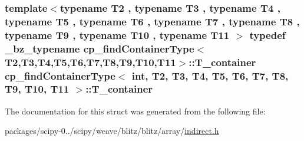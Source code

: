 \subsubsection[{T\+\_\+container}]{\setlength{\rightskip}{0pt plus 5cm}template$<$typename T2 , typename T3 , typename T4 , typename T5 , typename T6 , typename T7 , typename T8 , typename T9 , typename T10 , typename T11 $>$ typedef {\bf \+\_\+bz\+\_\+typename} {\bf cp\+\_\+find\+Container\+Type}$<$T2,T3,T4,T5,T6,T7,T8,T9,T10,T11$>$\+::{\bf T\+\_\+container} {\bf cp\+\_\+find\+Container\+Type}$<$ int, T2, T3, T4, T5, T6, T7, T8, T9, T10, T11 $>$\+::{\bf T\+\_\+container}}\label{structcp__findContainerType_3_01int_00_01T2_00_01T3_00_01T4_00_01T5_00_01T6_00_01T7_00_01T8_00_01T9_00_01T10_00_01T11_01_4_a237316b3c2e3063068f6dc36d31b8b5b}


The documentation for this struct was generated from the following file\+:\begin{DoxyCompactItemize}
\item 
packages/scipy-\/0../scipy/weave/blitz/blitz/array/\hyperlink{indirect_8h}{indirect.\+h}\end{DoxyCompactItemize}
